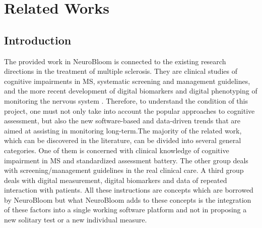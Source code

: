 \documentclass[12pt,a4paper]{report}
\begin{document}
\chapter{Related Works}

\section{Introduction}
The provided work in NeuroBloom is connected to the existing research directions in the treatment of multiple sclerosis. They are clinical studies of cognitive impairments in MS, systematic screening and management guidelines, and the more recent development of digital biomarkers and digital phenotyping of monitoring the nervous system  \cite{chiaravalloti2008,rocca2015,kalb2018,insel2017,coravos2019}.  Therefore, to understand the condition of this project, one must not only take into account the popular approaches to cognitive assessment, but also the new software-based and data-driven trends that are aimed at assisting in monitoring long-term.The majority of the related work, which can be discovered in the literature, can be divided into several general categories. One of them is concerned with clinical knowledge of cognitive impairment in MS and standardized assessment battery. The other group deals with screening/management guidelines in the real clinical care. A third group deals with digital measurement, digital biomarkers and data of repeated interaction with patients. All these instructions are concepts which are borrowed by NeuroBloom but what NeuroBloom adds to these concepts is the integration of these factors into a single working software platform and not in proposing a new solitary test or a new individual measure.
\end{document}
